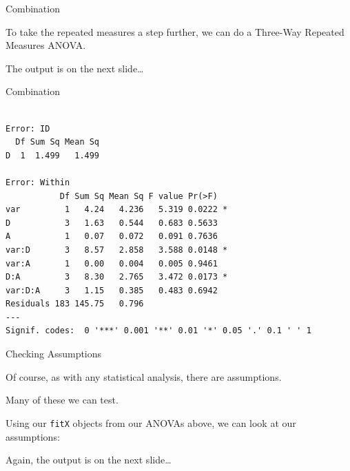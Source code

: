 \begin{frame}[fragile]{Combination}

To take the repeated measures a step further, we can do a Three-Way
Repeated Measures ANOVA.

\begin{Shaded}
\begin{Highlighting}[]
\StringTok{ }\OperatorTok{~}\StringTok{ }\OperatorTok{*}\StringTok{ }\OperatorTok{*}\StringTok{ }\OperatorTok{+}\StringTok{ }
\end{Highlighting}
\end{Shaded}

\center
\small
The output is on the next slide\ldots{}

\end{frame}

\begin{frame}[fragile]{Combination}

\small

\begin{verbatim}

Error: ID
  Df Sum Sq Mean Sq
D  1  1.499   1.499

Error: Within
           Df Sum Sq Mean Sq F value Pr(>F)  
var         1   4.24   4.236   5.319 0.0222 *
D           3   1.63   0.544   0.683 0.5633  
A           1   0.07   0.072   0.091 0.7636  
var:D       3   8.57   2.858   3.588 0.0148 *
var:A       1   0.00   0.004   0.005 0.9461  
D:A         3   8.30   2.765   3.472 0.0173 *
var:D:A     3   1.15   0.385   0.483 0.6942  
Residuals 183 145.75   0.796                 
---
Signif. codes:  0 '***' 0.001 '**' 0.01 '*' 0.05 '.' 0.1 ' ' 1
\end{verbatim}

\end{frame}

\begin{frame}[fragile]{Checking Assumptions}

\center
Of course, as with any statistical analysis, there are assumptions.

Many of these we can test.

Using our \texttt{fitX} objects from our ANOVAs above, we can look at
our assumptions:

\begin{Shaded}
\begin{Highlighting}[]
\NormalTok{(} \NormalTok{(}\NormalTok{,}
\end{Highlighting}
\end{Shaded}

\center
\small
Again, the output is on the next slide\ldots{}

\end{frame}

